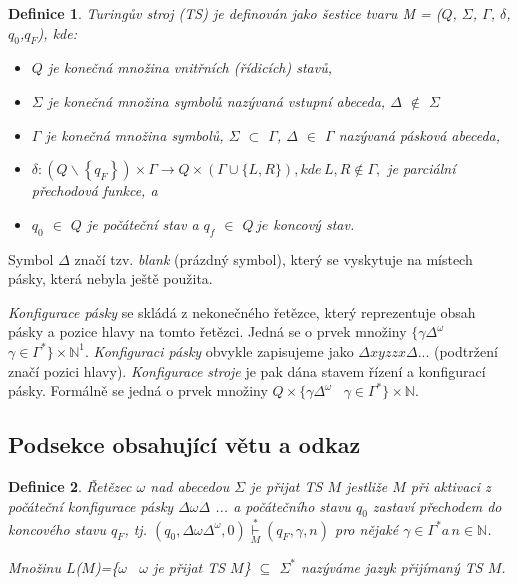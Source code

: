 \documentclass[a4paper, 11pt]{article}
\newtheorem{definice}{Definice}
\begin{document}
\begin{definice}
    \textnormal{Turingův stroj (TS)} je definován jako šestice tvaru M = ($Q$, $\Sigma$, $\Gamma$, $\delta$,$q_0$,$q_F$), kde:
    \begin{itemize}
        \setlength\itemsep{0.05em}
        \item $Q$ je konečná množina \textnormal{vnitřních (řídicích) stavů,}
        \item $\Sigma$ je konečná množina symbolů nazývaná \textnormal{vstupní abeceda,} $\Delta$ $\notin$ $\Sigma$
        \item $\Gamma$ je konečná množina symbolů,  $\Sigma$ $\subset$ $\Gamma$,  $\Delta$ $\in$ $\Gamma$ nazývaná \textnormal{pásková abeceda},
        \item $\delta:\left(Q\backslash\left\{q_F\right\}\right)\times\Gamma\rightarrow Q\times(\Gamma\cup\{L, R\}), kde \, L,R\notin \Gamma,$ je parciální \textnormal{přechodová funkce, a}
        \item $q_0$ $\in$ $Q$ je počáteční stav a $q_f$ $\in$ $Q \, je$ \textnormal{koncový stav}.
    \end{itemize}
\end{definice}
Symbol $\Delta$ značí tzv. \emph{blank} (prázdný symbol), který se vyskytuje na místech pásky, která nebyla ještě použita.

\emph{Konfigurace pásky} se skládá z nekonečného řetězce, který reprezentuje obsah pásky a pozice hlavy na tomto řetězci. Jedná se o prvek množiny $\{\gamma \Delta^\omega $ \textbar~$\gamma \in \Gamma^*\} \times \mathbb{N}^1$.
\emph{Konfiguraci pásky} obvykle zapisujeme jako $\Delta xyz$\underline{$z$}$x\Delta$... (podtržení značí pozici hlavy). \emph{Konfigurace stroje} je pak dána stavem řízení a konfigurací pásky. Formálně se jedná o prvek množiny $Q\times\{\gamma \Delta^\omega $ \textbar~$ \gamma \in \Gamma^*\} \times \mathbb{N}$.
\subsection{Podsekce obsahující větu a odkaz}

\begin{definice}
    \textnormal{Řetězec $\omega$ nad abecedou $\Sigma$ je přijat TS} $M$ jestliže $M$ při aktivaci z počáteční konfigurace pásky
    \underline{$\Delta$}$\omega\Delta$ ... a počátečního stavu $q_0$ zastaví přechodem do
    koncového stavu $q_F$, tj. $\left(q_0,\Delta\omega\Delta^\omega,0\right) \underset{M}{\overset{*}{\vdash}} \left(q_F,\gamma,n\right) $ pro nějaké $\gamma \in \Gamma^* a\,n \in \mathbb{N}$.
    
    Množinu $L$($M$)=\{$\omega$ \textbar~$\omega$ je přijat TS $M$\} $\subseteq$ $\Sigma^*$ nazýváme \textnormal{jazyk přijímaný TS} $M$.
\end{definice}
\end{document}
